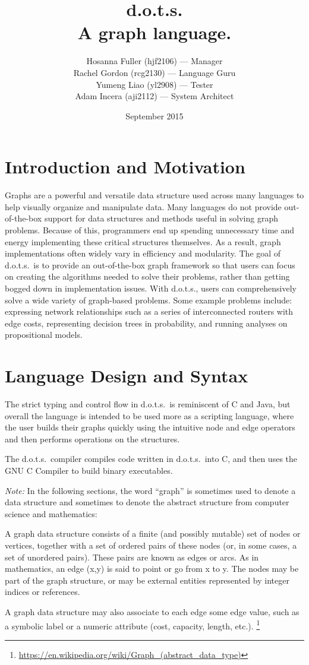 \documentclass{article}
\title{d.o.t.s. \\ A graph language.}
\author{Hosanna Fuller (hjf2106) --- Manager\\
Rachel Gordon (rcg2130) --- Language Guru\\
Yumeng Liao (yl2908) --- Tester\\
Adam Incera (aji2112) --- System Architect}
\date{September 2015}
\newcommand\fnurl[2]{%
  \href{#2}{#1}\footnote{\url{#2}}%
} %
\newcommand{\pltlang}{d.o.t.s.} %
\begin{document}
\maketitle

\tableofcontents
\newpage

\section{Introduction and Motivation}
Graphs are a  powerful and versatile data structure used across many languages to help visually organize and manipulate data. Many languages do not provide out-of-the-box  support for data structures and methods useful in solving graph problems. Because of this, programmers end up spending unnecessary time and energy implementing these critical structures themselves. As a result, graph implementations often widely vary in efficiency and modularity. The goal of \pltlang\ is to provide an out-of-the-box graph framework so that users can focus on creating the algorithms needed to solve their problems, rather than getting bogged down in implementation issues. With d.o.t.s., users can comprehensively solve a wide variety of graph-based problems. Some example problems include:  expressing network relationships such as a series of interconnected routers with edge costs, representing decision trees in probability, and running analyses on propositional models. 

\section{Language Design and Syntax}

The strict typing and control flow in \pltlang\ is reminiscent of C and Java, but overall the language is intended to be used more as a scripting language, where the user builds their graphs quickly using the intuitive node and edge operators and then performs operations on the structures. 

The \pltlang\ compiler compiles code written in \pltlang\ into C, and then uses the GNU C Compiler to build binary executables.

{\emph{Note:}} In the following sections, the word ``graph'' is sometimes used to denote a data structure and sometimes to denote the abstract structure from computer science and mathematics:

\begin{displayquote}
A graph data structure consists of a finite (and possibly mutable) set of nodes or vertices, together with a set of ordered pairs of these nodes (or, in some cases, a set of unordered pairs). These pairs are known as edges or arcs. As in mathematics, an edge (x,y) is said to point or go from x to y. The nodes may be part of the graph structure, or may be external entities represented by integer indices or references.

A graph data structure may also associate to each edge some edge value, such as a symbolic label or a numeric attribute (cost, capacity, length, etc.). \fnurl{}{https://en.wikipedia.org/wiki/Graph_(abstract_data_type)}
\end{displayquote}
\end{document}
